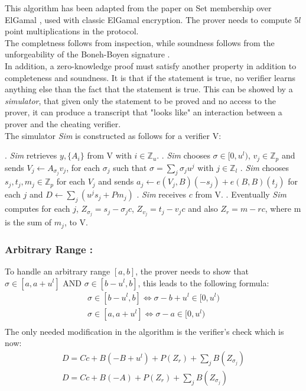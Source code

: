 \documentclass{article}
\begin{document}
This algorithm has been adapted from the paper on Set membership over ElGamal \cite{range}, used with classic ElGamal encryption. The prover needs to compute $5l$ point multiplications in the protocol.\\
The completness follows from inspection, while soundness follows from the unforgeability of the Boneh-Boyen signature \cite{boneh}.\\
In addition, a zero-knowledge proof must satisfy another property in addition to completeness and soundness. It is that if the statement is true, no verifier learns anything else than the fact that the statement is true.
This can be showed by a \textit{simulator}, that given only the statement to be proved and no access to the prover, it can produce a transcript that "looks like" an interaction between a prover and the cheating verifier.\\
The simulator \textit{Sim} is constructed as follows for a verifier V:\\

\begin{algorithmic}
. \textit{Sim} retrieves $y,\{A_i\}$ from V with $i \in \mathbb{Z}_u$.
. \textit{Sim} chooses $\sigma \in [0,u^l)$, $v_j \in \mathbb{Z}_p$ and sends $V_j \gets A_{\sigma_j} v_j$, for each $\sigma_j$ such that $\sigma = \sum_{j}{\sigma_j u^j}$ with $ j \in \mathbb{Z}_l$
. \textit{Sim} chooses $s_j,t_j,m_j \in \mathbb{Z}_p$ for each $V_j$ and sends $a_j \gets e(V_j,B)(-s_j) + e(B,B)(t_j)$ for each $j$ and $D \gets \sum_{j}{(u^j s_j + Pm_j)}$
. \textit{Sim} receives $c$ from V.
. Eventually \textit{Sim} computes for each $j$, $Z_{\sigma_j} =s_j - \sigma_j c$, $Z_{v_j} = t_j - v_j c$ and also $Z_r = m - rc$, where m is the sum of $m_j$, to V.  
\end{algorithmic}

\subsubsection*{Arbitrary Range :}
To handle an arbitrary range $[a,b]$, the prover needs to show that $\sigma \in [a,a+u^l]$ AND $ \sigma \in [b-u^l,b]$, this leads to the following formula:\\
\begin{gather*}
 \sigma \in [b-u^l,b] \Longleftrightarrow   \sigma - b + u^l \in [0,u^l) \\
\sigma \in [a,a+u^l] \Longleftrightarrow   \sigma - a  \in [0,u^l)\\
\end{gather*}
The only needed modification in the algorithm is the verifier's check which is now:
\begin{gather*}
D = Cc+B(-B+u^l)+P(Z_r)+\sum_j{B(Z_{\sigma_j})}\\
D= Cc+B(-A)+P(Z_r)+\sum_j{B(Z_{\sigma_j})}
\end{gather*}
\end{document}
